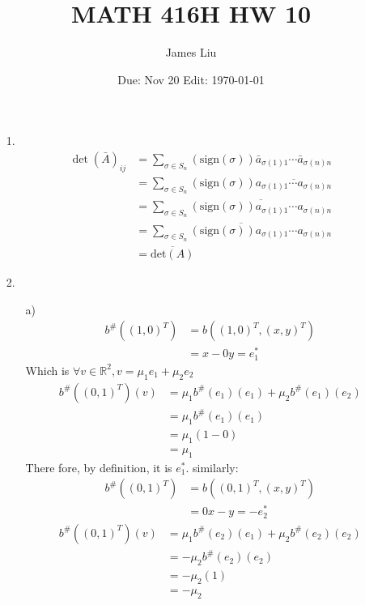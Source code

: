 \documentclass{article}
\date{Due: Nov 20 Edit: \today}
\title{MATH 416H HW 10}
\author{James Liu}
\begin{document}
\maketitle
\begin{itemize}
    \item [1.]
    \begin{align*}
        \det(\bar A)_{ij} &=\sum_{\sigma\in S_n}(\text{sign}(\sigma))\bar a_{\sigma(1)1}\cdots \bar a_{\sigma(n)n}\\
        &= \sum_{\sigma\in S_n}(\text{sign}(\sigma))\overline{a_{\sigma(1)1}\cdots a_{\sigma(n)n}}\\
        &=\sum_{\sigma\in S_n}\overline{(\text{sign}(\sigma))a_{\sigma(1)1}\cdots a_{\sigma(n)n}}\\
        &=\overline{\sum_{\sigma\in S_n}(\text{sign}(\sigma))a_{\sigma(1)1}\cdots a_{\sigma(n)n}}\\
        &=\overline{\text{det}(A)}
    \end{align*}
    \item [2.] 
    \begin{itemize}
        \item [a)]
        \begin{align*}
            b^\#((1,0)^T) &= b((1,0)^T,(x,y)^T)\\
            &=x-0y = e_1^* 
        \end{align*}
        Which is \(\forall v \in \mathbb{R}^2, v=\mu_1e_1+\mu_2e_2\)
        \begin{align*}
            b^\#((0,1)^T)(v)&=\mu_1b^\#(e_1)(e_1)+\mu_2b^\#(e_1)(e_2)\\
            &=\mu_1b^\#(e_1)(e_1)\\
            &=\mu_1(1-0)\\
            &=\mu_1
        \end{align*}
        There fore, by definition, it is \(e_1^*\). similarly:
        \begin{align*}
            b^\#((0,1)^T) &= b((0,1)^T,(x,y)^T)\\
            &=0x-y = -e_2^* 
        \end{align*}
        \begin{align*}
            b^\#((0,1)^T)(v)&=\mu_1b^\#(e_2)(e_1)+\mu_2b^\#(e_2)(e_2)\\
            &=-\mu_2b^\#(e_2)(e_2)\\
            &=-\mu_2(1)\\
            &=-\mu_2
        \end{align*}

\end{itemize}
\end{itemize}
\end{document}
